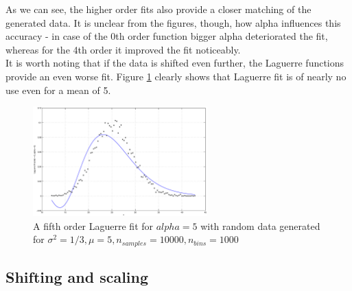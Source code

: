 \documentclass[a4paper]{article}
\numberwithin{equation}{section}
\begin{document}
\noindent As we can see, the higher order fits also provide a closer matching of the generated data. It is unclear from the figures, though, how alpha influences this accuracy - in case of the 0th order function bigger alpha deteriorated the fit, whereas for the 4th order it improved the fit noticeably. \\

\noindent It is worth noting that if the data is shifted even further, the Laguerre functions provide an even worse fit. Figure \ref{fig:poorfit} clearly shows that Laguerre fit is of nearly no use even for a mean of 5.

\begin{figure}[!h]
\centering
\includegraphics[width=0.6\textwidth]{poor_fit.eps}
\caption{\label{fig:poorfit}A fifth order Laguerre fit for $alpha=5$ with random data generated for $\sigma^2=1/3, \mu=5, n_{samples} = 10000, n_{bins} = 1000$}
\end{figure}

\subsection{Shifting and scaling}
\end{document}
